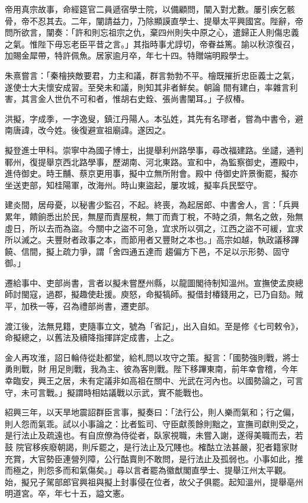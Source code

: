 \begin{pinyinscope}
 帝用真宗故事，命經筵官二員遞宿學士院，以備顧問，闡入對尤數。屢引疾乞骸
 骨，帝不忍其去。二年，闡請益力，乃除顯謨直學士、提舉太平興國宮。陛辭，帝問所欲言，闡奏：「許和則忘祖宗之仇，棄四州則失中原之心，遣歸正人則傷忠義之氣。惟陛下毋忘老臣平昔之言。」其指時事尤諄切，帝眷益篤。諭以秋涼復召，加賜金犀帶，特許佩魚。居家逾月卒，年七十四。特贈端明殿學士。



 朱熹嘗言：「秦檜挾敵要君，力主和議，群言勃勃不平。檜既摧折忠臣義士之氣，遂使士大夫懷安成習。至癸未和議，則知其非者鮮矣。朝論
 間有建白，率雜言利害，其言金人世仇不可和者，惟胡右史銓、張尚書闡耳。」子叔椿。



 洪擬，字成季，一字逸叟，鎮江丹陽人。本弘姓，其先有名璆者，嘗為中書令，避南唐諱，改今姓。後復避宣祖廟諱。遂因之。



 擬登進士甲科。崇寧中為國子博士，出提舉利州路學事，尋改福建路。坐譴，通判鄆州，復提舉京西北路學事，歷湖南、河北東路。宣和中，為監察御史，遷殿中，進侍御史。時王黼、蔡京更用事，擬中立無所附會。殿中
 侍御史許景衡罷，擬亦坐送吏部，知桂陽軍，改海州。時山東盜起，屢攻城，擬率兵民堅守。



 建炎間，居母憂，以秘書少監召，不起。終喪，為起居郎、中書舍人，言：「兵興累年，饋餉悉出於民，無屋而責屋稅，無丁而責丁稅，不時之須，無名之斂，殆無虛日，所以去而為盜。今關中之盜不可急，宜求所以弭之，江西之盜不可緩，宜求所以滅之。夫豐財者政事之本，而節用者又豐財之本也。」高宗如越，執政議移蹕饒、信間，擬上疏力爭，謂「舍四通五達而
 趨偏方下邑，不足以示形勢、固守御。」



 遷給事中、吏部尚書，言者以擬未嘗歷州縣，以龍圖閣待制知溫州。宣撫使孟庾總師討閩寇，過郡，擬趣使赴援。庾怒，命擬犒師。擬借封椿錢用之，已乃自劾。賊平，加秩一等，召為禮部尚書，遷吏部。



 渡江後，法無見籍，吏隨事立文，號為「省記」，出入自如。至是修《七司敕令》，命擬總之，以舊法及續降指揮詳定成書，上之。



 金人再攻淮，詔日輪侍從赴都堂，給札問以攻守之策。擬言：「國勢強則戰，將士勇則戰，財
 用足則戰，我為主、彼為客則戰。陛下移蹕東南，前年幸會稽，今年幸臨安，興王之居，未有定議非如高祖在關中、光武在河內也。以國勢論之，可言守，未可言戰。」擬謂時相姑議戰以示武，實不能戰也。



 紹興三年，以天旱地震詔群臣言事，擬奏曰：「法行公，則人樂而氣和；行之偏，則人怨而氣乖。試以小事論之：比者監司、守臣獻羨餘則黜之，宣撫司獻則受之，是行法止及疏遠也。有自庶僚為侍從者，臥家視職，未嘗入謝，遂得美職而去，若鼓
 院官移疾廢朝謁，則斥罷之，是行法止及冗賤也。榷酤立法甚嚴，犯者籍家財充賞，大官勢臣連營列障，公行酤賣則不敢問，是行法止及孤弱也。小事如此，推而極之，則怨多而和氣傷矣。」尋以言者罷為徽猷閣直學士、提舉江州太平觀。始，擬兄子駕部郎官興祖與擬上封事侵在位者，故父子俱罷。起知溫州，提舉亳州明道宮。卒，年七十五，謚文憲。




\end{pinyinscope}
